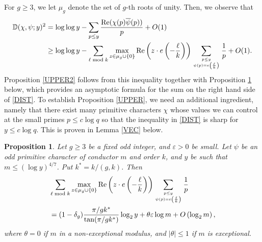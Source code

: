 \documentclass[12pt]{amsart}
\newtheorem{pro}[thm]{Proposition}
\theoremstyle{definition}
\numberwithin{equation}{section}
\newcommand{\mb}{\mathbb}
\renewcommand{\bar}{\overline}
\begin{document}
For $g \geq 3$, we let $\mu_g$ denote the set of $g$-th roots of unity. Then, we observe that
\begin{align}
\mb{D}(\chi,\psi;y)^2 &= \log\log y- \sum_{p \leq y} \frac{\text{Re}(\chi(p)\bar{\psi}(p))}{p} +O(1)  \nonumber\\
&\geq  \log \log  y - \sum_{\ell\bmod k} \max_{z \in \mu_g \cup \{0\}} \text{Re}\left(z \cdot e\left(-\frac{\ell}{k}\right)\right)\sum_{p \leq y \atop \psi(p)= e\left(\frac{\ell}{k}\right)} \frac{1}{p} +O(1).\label{DIST}
\end{align}
Proposition \ref{UPPER2} follows from this inequality together with Proposition \ref{PreciseSumMax} below, which provides an asymptotic formula for the sum on the right hand side of \eqref{DIST}. To establish Proposition \ref{UPPER}, we need an additional ingredient, namely that there exist many primitive characters $\chi$ whose values we can control at the small primes $p\leq c \log q$ so that the inequality in \eqref{DIST} is sharp for $y\leq c\log q$. This is proven in Lemma \ref{VEC} below. 
\begin{pro}\label{PreciseSumMax}
Let $g\geq 3$ be a fixed odd integer, and $\varepsilon>0$ be small. Let $\psi$ be an odd primitive character of conductor $m$ and order $k$, and $y$ be such that $m\leq (\log y)^{4/7}$. Put $k^{\ast}=k/(g,k)$. Then 
\begin{equation}\label{AsymptoticMaxSumRE}
\begin{aligned}
&\sum_{\ell\bmod k} \max_{z \in \mu_g \cup \{0\}} \textup{Re}\left(z \cdot e\left(-\frac{\ell}{k}\right)\right)\sum_{p \leq y \atop \psi(p)= e\left(\frac{\ell}{k}\right)} \frac{1}{p} \\
&= (1-\delta_g)\frac{\pi/gk^{\ast}}{\tan(\pi/gk^{\ast})}\log_2 y + \theta \varepsilon \log m+ O\left(\log_2 m\right),
\end{aligned}
\end{equation}
where $\theta=0$ if $m$ in a non-exceptional modulus, and $|\theta|\leq 1$ if $m$ is exceptional. 
\end{pro}
\end{document}
